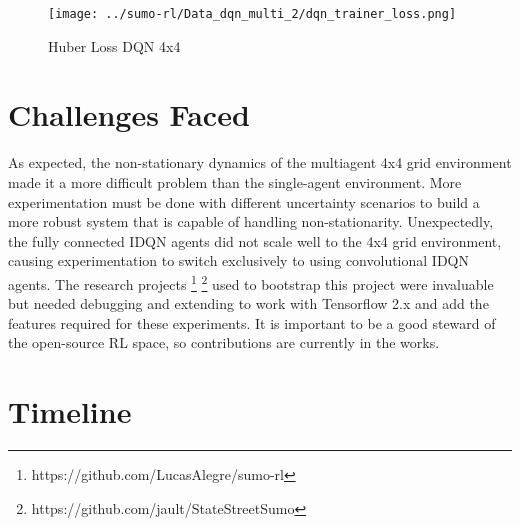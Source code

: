 \documentclass[letterpaper]{article} %
\begin{document}
\begin{figure}[htbp]
  \centering
  \texttt{[image: ../sumo-rl/Data\_dqn\_multi\_2/dqn\_trainer\_loss.png]}
  \caption{Huber Loss DQN 4x4}
  \label{fig:loss_dqn_multi}
\end{figure}

\section{Challenges Faced}
As expected, the non-stationary dynamics of the multiagent 4x4 grid environment made it a more difficult problem than the single-agent environment.
More experimentation must be done with different uncertainty scenarios to build a more robust system that is capable of handling non-stationarity.
Unexpectedly, the fully connected IDQN agents did not scale well to the 4x4 grid environment, causing experimentation to switch exclusively to using convolutional IDQN agents.
The research projects \footnote{https://github.com/LucasAlegre/sumo-rl} \footnote{https://github.com/jault/StateStreetSumo} used to bootstrap this project were invaluable but needed debugging and extending to work with Tensorflow 2.x and add the features required for these experiments.
It is important to be a good steward of the open-source RL space, so contributions are currently in the works.


\section{Timeline}
\end{document}
